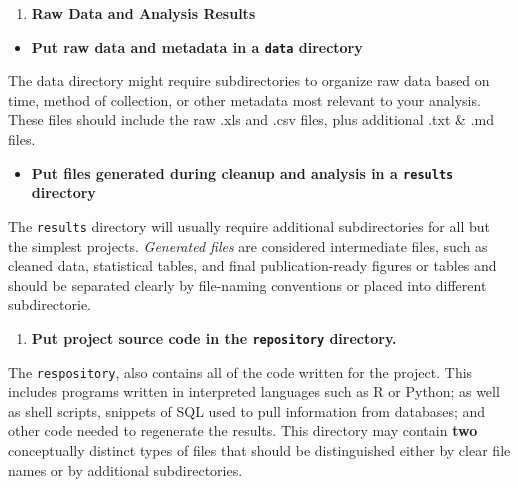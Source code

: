 \documentclass[
]{book}
\providecommand{\tightlist}{%
  \setlength{\itemsep}{0pt}\setlength{\parskip}{0pt}}
\begin{document}
\begin{enumerate}
\def\labelenumi{\arabic{enumi}.}
\setcounter{enumi}{2}
\tightlist
\item
  \textbf{Raw Data and Analysis Results}
\end{enumerate}

\begin{itemize}
\tightlist
\item
  \textbf{Put raw data and metadata in a \texttt{data} directory}
\end{itemize}

The data directory might require subdirectories to organize raw data based on time, method of collection, or other metadata most relevant to your analysis. These files should include the raw .xls and .csv files, plus additional .txt \& .md files.

\begin{itemize}
\tightlist
\item
  \textbf{Put files generated during cleanup and analysis in a \texttt{results} directory}
\end{itemize}

The \texttt{results} directory will usually require additional subdirectories for all but the simplest projects. \emph{Generated files} are considered intermediate files, such as cleaned data, statistical tables, and final publication-ready figures or tables and should be separated clearly by file-naming conventions or placed into different subdirectorie.

\begin{enumerate}
\def\labelenumi{\arabic{enumi}.}
\setcounter{enumi}{3}
\tightlist
\item
  \textbf{Put project source code in the \texttt{repository} directory.}
\end{enumerate}

The \texttt{respository}, also contains all of the code written for the project. This includes programs written in interpreted languages such as R or Python; as well as shell scripts, snippets of SQL used to pull information from databases; and other code needed to regenerate the results.
This directory may contain \textbf{two} conceptually distinct types of files that should be distinguished either by clear file names or by additional subdirectories.
\end{document}
